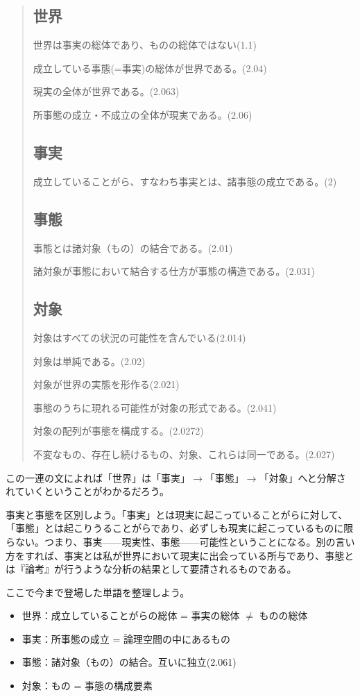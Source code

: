 \documentclass[a4paper,11pt]{jsarticle}
\begin{document}
\begin{quote}
\subsection*{世界}
世界は事実の総体であり、ものの総体ではない(1.1) 

成立している事態(=事実)の総体が世界である。(2.04)

現実の全体が世界である。(2.063)

所事態の成立・不成立の全体が現実である。(2.06)

\subsection*{事実}
成立していることがら、すなわち事実とは、諸事態の成立である。(2)

\subsection*{事態}
事態とは諸対象（もの）の結合である。(2.01)

諸対象が事態において結合する仕方が事態の構造である。(2.031)
\subsection*{対象}
対象はすべての状況の可能性を含んでいる(2.014)

対象は単純である。(2.02)

対象が世界の実態を形作る(2.021)

事態のうちに現れる可能性が対象の形式である。(2.041)

対象の配列が事態を構成する。(2.0272)

不変なもの、存在し続けるもの、対象、これらは同一である。(2.027)
\end{quote}

この一連の文によれば「世界」は「事実」$\rightarrow$「事態」$\rightarrow$「対象」へと分解されていくということがわかるだろう。


事実と事態を区別しよう。「事実」とは現実に起こっていることがらに対して、「事態」とは起こりうることがらであり、必ずしも現実に起こっているものに限らない。つまり、事実------現実性、事態------可能性ということになる。別の言い方をすれば、事実とは私が世界において現実に出会っている所与であり、事態とは『論考』が行うような分析の結果として要請されるものである。

ここで今まで登場した単語を整理しよう。

\begin{itemize}
\item 世界：成立していることがらの総体 = 事実の総体 $\neq$ ものの総体
\item 事実：所事態の成立 = 論理空間の中にあるもの
\item 事態：諸対象（もの）の結合。互いに独立(2.061)
\item 対象：もの = 事態の構成要素

\end{itemize}
\end{document}
